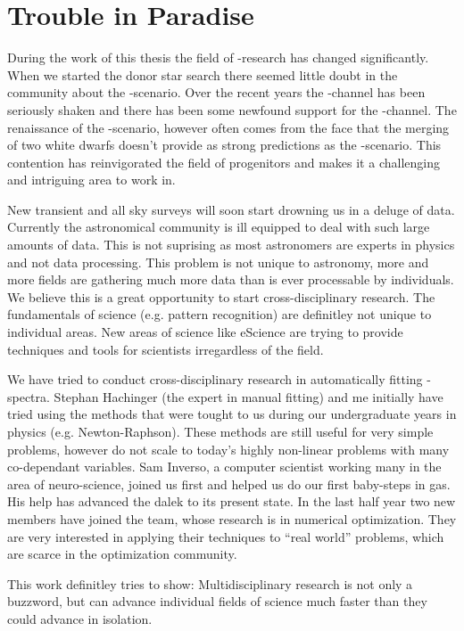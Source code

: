 \section{Trouble in Paradise}

During the work of this thesis the field of \snia-research has changed significantly. When we started the donor star search there seemed little doubt in the community about the \sd-scenario. Over the recent years the \sd-channel has been seriously shaken and there has been some newfound support for the \dd-channel. The renaissance of the \dd-scenario, however often comes from the face that the merging of two white dwarfs doesn't provide as strong predictions as the \sd-scenario. This contention has reinvigorated the field of \snia progenitors and makes it a challenging and intriguing area to work in.

New transient and all sky surveys will soon start drowning us in a deluge of data. Currently the astronomical community is ill equipped to deal with such large amounts of data. This is not suprising as most astronomers are experts in physics and not data processing. This problem is not unique to astronomy, more and more fields are gathering much more data than is ever processable by individuals. We believe this is a great opportunity to start cross-disciplinary research. The fundamentals of science (e.g. pattern recognition) are definitley not unique to individual areas. New areas of science like eScience are trying to provide techniques and tools for scientists irregardless of the field. 

We have tried to conduct cross-disciplinary research in automatically fitting \sneia-spectra. Stephan Hachinger (the expert in manual fitting) and me initially have tried using the methods that were tought to us during our undergraduate years in physics (e.g. Newton-Raphson). These methods are still useful for very simple problems, however do not scale to today's highly non-linear problems with many co-dependant variables. Sam Inverso, a computer scientist working many in the area of neuro-science, joined us first and helped us do our first baby-steps in \glspl{ga}. His help has advanced the \gls{dalek} to its present state. In the last half year two new members have joined the team, whose research is in numerical optimization. They are very interested in applying their techniques to ``real world'' problems, which are scarce in the optimization community.

This work definitley tries to show: Multidisciplinary research is not only a buzzword, but can advance individual fields of science much faster than they could advance in isolation.



